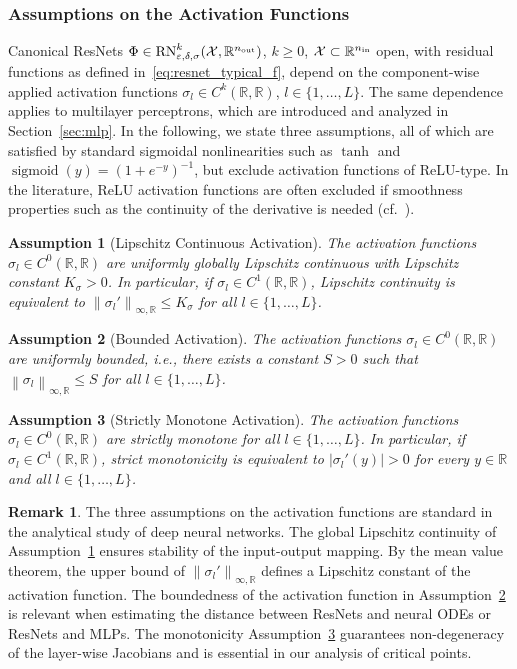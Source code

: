 \documentclass[10pt]{article}
\newtheorem{assumpA}{Assumption}
\theoremstyle{definition}
\newtheorem{remark}[theorem]{Remark}
\numberwithin{equation}{section}
\newcommand{\eps}{\varepsilon}
\newcommand\norm[1]{\left\lVert#1\right\rVert}
\newcommand\abs[1]{\left\lvert#1\right\rvert}
\newcommand{\R}{\mathbb{R}}
\newcommand*{\nout}{n_\textup{out}}
\newcommand*{\nin}{n_\textup{in}}
\begin{document}
\subsubsection*{Assumptions on the Activation Functions}

Canonical ResNets $\Phi \in \textup{RN}^k_{\eps,\delta,\sigma}(\mathcal{X},\R^{\nout})$, $k \geq 0$, $\mathcal{X}\subset \R^{\nin}$ open, with residual functions as defined in~\eqref{eq:resnet_typical_f}, depend on the component-wise applied activation functions $\sigma_l \in C^k(\R,\R)$, $l \in \{1,\ldots,L\}$. The same dependence applies to multilayer perceptrons, which are introduced and analyzed in Section~\ref{sec:mlp}. In the following, we state three assumptions, all of which are satisfied by standard sigmoidal nonlinearities such as $\tanh$ and $\operatorname{sigmoid}(y) = (1+e^{-y})^{-1}$, but exclude activation functions of ReLU-type. In the literature, ReLU activation functions are often excluded if smoothness properties such as the continuity of the derivative is needed (cf.~\cite{MWSB24}). 

\begin{assumpA}[Lipschitz Continuous Activation]
	\label{ass:A_activation_lipschitz}
	The activation functions $\sigma_l \in C^0(\R,\R)$ are uniformly globally Lipschitz continuous with Lipschitz constant $K_\sigma>0$. In particular, if $\sigma_l \in C^1(\R,\R)$, Lipschitz continuity is equivalent to $\norm{\sigma_l'}_{\infty,\R} \leq K_\sigma$ for all $l \in \{1,\ldots,L\}$.
\end{assumpA}

\begin{assumpA}[Bounded Activation]
	\label{ass:A_activation_bounded}
	The activation functions $\sigma_l \in C^0(\R,\R)$ are uniformly bounded, i.e., there exists a constant $S > 0$ such that $\norm{\sigma_l}_{\infty,\R} \leq S$ for all $l \in \{1,\ldots,L\}$.
\end{assumpA}

\begin{assumpA}[Strictly Monotone Activation]
	\label{ass:A_activation_monotone}
	The activation functions $\sigma_l \in C^0(\R,\R)$ are strictly monotone for all $l \in \{1,\ldots,L\}$. In particular, if $\sigma_l \in C^1(\R,\R)$, strict monotonicity is equivalent to $ \abs{\sigma_l'(y)} > 0$ for every $y \in \R$ and all $l \in \{1,\ldots,L\}$. 
\end{assumpA}

\begin{remark}
	The three assumptions on the activation functions are standard in the analytical study of deep neural networks. The global Lipschitz continuity of Assumption~\ref{ass:A_activation_lipschitz} ensures stability of the input-output mapping. By the mean value theorem, the upper bound of $\norm{\sigma_l'}_{\infty,\R}$ defines a Lipschitz constant of the activation function. The boundedness of the activation function in Assumption~\ref{ass:A_activation_bounded} is relevant when estimating the distance between ResNets and neural ODEs or ResNets and MLPs. The monotonicity Assumption~\ref{ass:A_activation_monotone} guarantees non-degeneracy of the layer-wise Jacobians and is essential in our analysis of critical points.
\end{remark}
\end{document}

